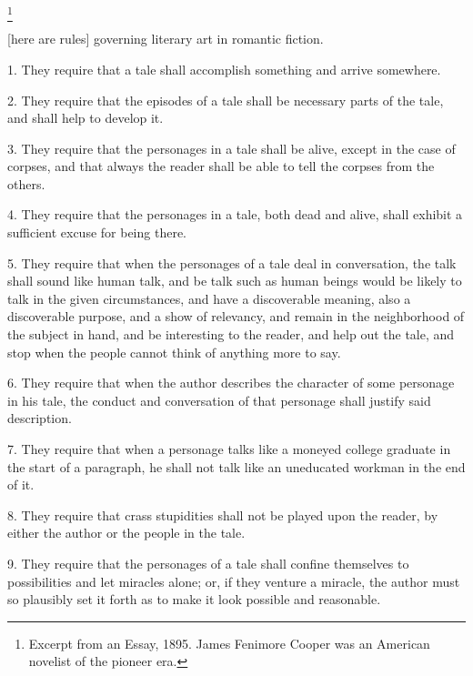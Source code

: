 \documentclass[../demo.tex]{novelette-subdoc}
\begin{document}
\begin{opening}
\footnote{Excerpt from an Essay, 1895. James Fenimore Cooper was
an American novelist of the pioneer era.}
\null
{}
\null
\end{opening}


[here are rules] governing literary art in romantic fiction.

1. They require that a tale shall accomplish something and arrive
somewhere.

2. They require that the episodes of a tale shall be necessary parts of
the tale, and shall help to develop it.

3. They require that the personages in a tale shall be alive, except in
the case of corpses, and that always the reader shall be able to tell
the corpses from the others.

4. They require that the personages in a tale, both dead and alive,
shall exhibit a sufficient excuse for being there.

5. They require that when the personages of a tale deal in conversation,
the talk shall sound like human talk, and be talk such as human
beings would be likely to talk in the given circumstances, and have
a discoverable meaning, also a discoverable purpose, and a show of
relevancy, and remain in the neighborhood of the subject in hand, and
be interesting to the reader, and help out the tale, and stop when the
people cannot think of anything more to say.

6. They require that when the author describes the character of some
personage in his tale, the conduct and conversation of that personage
shall justify said description.

7. They require that when a personage talks like a moneyed college
graduate in the start of a paragraph, he shall not talk
like an uneducated workman in the end of it.

8. They require that crass stupidities shall not be played upon the
reader, by either the author or the people in the tale.

9. They require that the personages of a tale shall confine themselves
to possibilities and let miracles alone; or, if they venture a miracle,
the author must so plausibly set it forth as to make it look possible
and reasonable.
\end{document}
